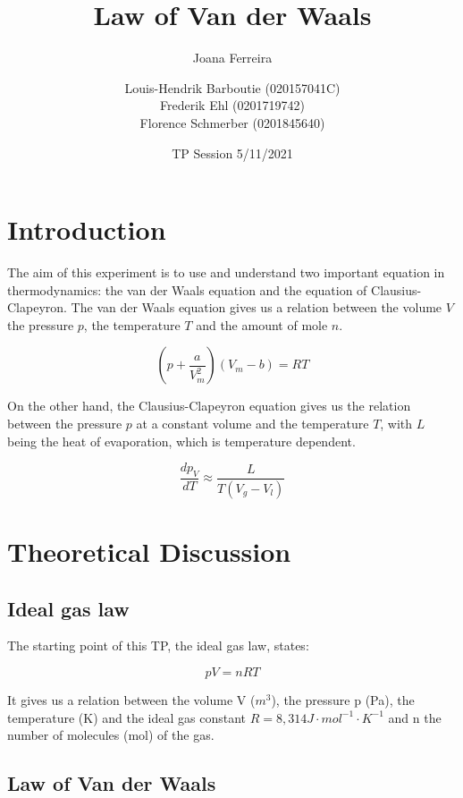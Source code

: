 \documentclass{scrartcl}
\title{Law of Van der Waals}
\subtitle{Joana Ferreira}
\date{TP Session 5/11/2021}
\author{Louis-Hendrik Barboutie (020157041C)\\ Frederik Ehl (0201719742) \\ Florence Schmerber (0201845640)}
\begin{document}
\maketitle

\clearpage

\tableofcontents
\listoffigures
	
\clearpage

\section{Introduction}

The aim of this experiment is to use and understand two important equation in thermodynamics: the van der Waals equation and the equation of Clausius-Clapeyron. The van der Waals equation gives us a relation between the volume $V$ the pressure $p$, the temperature $T$ and the amount of mole $n$.

\begin{equation}
    (p + \frac{a}{V_m^2})(V_m-b)=RT\nonumber
\end{equation}

On the other hand, the Clausius-Clapeyron equation gives us the relation between the pressure $p$ at a constant volume and the temperature $T$, with $L$ being the heat of evaporation, which is temperature dependent.

\begin{equation}
    \frac{dp_V}{dT} \approx \frac{L}{T(V_g-V_l)}\nonumber
\end{equation}

\section{Theoretical Discussion}

\subsection{Ideal gas law}

The starting point of this TP, the ideal gas law, states:

\begin{equation}
    \boxed{pV=nRT}
\end{equation}

It gives us a relation between the volume V ($m^3$), the pressure p (Pa), the temperature (K) and the ideal gas constant $R=8,314J\cdot mol^{-1}\cdot K^{-1}$ and n the number of molecules (mol) of the gas.

\subsection{Law of Van der Waals}
\end{document}
